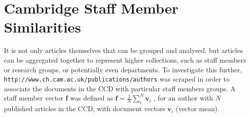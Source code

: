 \section{Cambridge Staff Member Similarities}
\label{sec:AUTHORCLUSTERS}

It is not only articles themselves that can be grouped and analysed, but articles can be aggregated together to represent higher collections, such as staff members or research groups, or potentially even departments. 
To investigate this further, \texttt{http://www.ch.cam.ac.uk/publications/authors} was scraped in order to associate the documents in the CCD with particular staff members groups. A staff member vector $\textbf{f}$ was defined as $\mathbf{f}=\frac{1}{N}\sum_{i}^{N} \mathbf{v}_i$ , for an author with $N$ published articles in the CCD, with document vectors $\mathbf{v}_i$ (vector mean).

